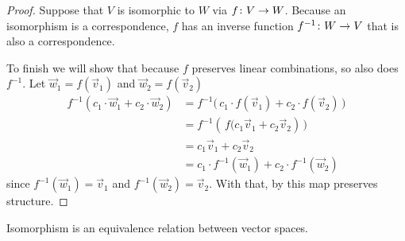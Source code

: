 \begin{proof}
Suppose that $V$ is isomorphic to $W$ via $\mbox{$f\colon V\to W$}$.  
Because an isomorphism is a correspondence, 
$f$ has an inverse function 
$\mbox{$f^{-1}\colon W\to V$}$ 
that is also a correspondence.

To finish we will show that because
$f$ preserves linear combinations, so also does $f^{-1}$.
Let \( \vec{w}_1=f(\vec{v}_1) \) and \( \vec{w}_2=f(\vec{v}_2) \)
\begin{align*}
  f^{-1}(c_1\cdot\vec{w}_1+c_2\cdot\vec{w}_2)
    &=f^{-1}\bigl(\,c_1\cdot f(\vec{v}_1)
                             +c_2\cdot f(\vec{v}_2)\,\bigr) \\
    &=f^{-1}(\,f\bigl(c_1\vec{v}_1+c_2\vec{v}_2)\,\bigr)    \\
    &=c_1\vec{v}_1+c_2\vec{v}_2                             \\ 
    &=c_1\cdot f^{-1}(\vec{w}_1)+c_2\cdot f^{-1}(\vec{w}_2)     
\end{align*}
since \( f^{-1}(\vec{w}_1)=\vec{v}_1 \) 
and \( f^{-1}(\vec{w}_2)=\vec{v}_2 \).
With that, by
 this map preserves
structure.
\end{proof}

\begin{theorem}
\label{th:IsoEquivRel}
Isomorphism is an equivalence
relation between vector spaces.
\end{theorem}

